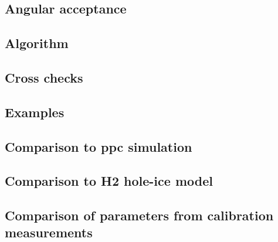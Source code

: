 \documentclass[green, 12pt]{beamer}
\begin{document}
\subsection{Angular acceptance}
  
  

\subsection{Algorithm}
  

\subsection{Cross checks}
  
  
  

\subsection{Examples}
  
  
  
  
  
  
  
  
  
  
%
%
%
%   
%
%   
%
%   
%
\subsection{Comparison to ppc simulation}
  
\subsection{Comparison to H2 hole-ice model}
  
\subsection{Comparison of parameters from calibration measurements}
  
\end{document}
